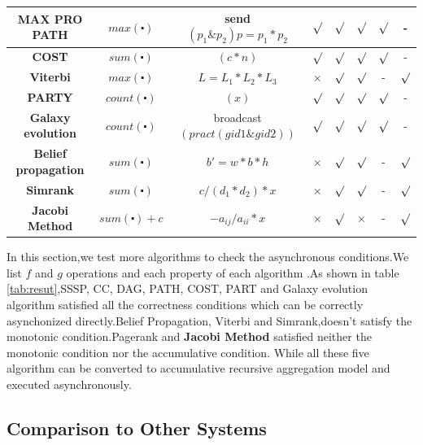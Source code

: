 \begin{table}[!t]
\begin{tabular}{c|c|c|c|c|c|c|c}
		\textbf{MAX PRO PATH} & $max(\centerdot)$ &  send$(p_1\& p_2) p=p_1*p_2$ & $\surd$ & $\surd$ & $\surd$ & $\surd$ & -\\
		\hline
		\textbf{COST} & $sum(\centerdot)$&$(c*n)$ & $\surd$ & $\surd$ & $\surd$ & $\surd$ & -\\
		\hline
		\textbf{Viterbi} & $max(\centerdot)$ & $L=L_1*L_2*L_3$ & $\times$ & $\surd$ &  $\surd$ &  - &$\surd$\\
		\hline
		\textbf{PARTY} & $count(\centerdot)$&$(x)$ & $\surd$ & $\surd$ & $\surd$ & $\surd$ & -\\
		\hline
		\textbf{Galaxy evolution} & $count(\centerdot)$ &broadcast$(pract(gid1\& gid2))$ & $\surd$ & $\surd$ & $\surd$ & $\surd$ & -\\
		\hline
		\textbf{Belief propagation} & $sum(\centerdot)$ &$b'=w*b*h$ & $\times$ & $\surd$ & $\surd$ & - & $\surd$\\
		\hline
		\textbf{Simrank} & $sum(\centerdot)$& $c/(d_1*d_2)*x$ & $\times$ &  $\surd$ &  $\surd$ & - & $\surd$\\
		\hline
		\textbf{Jacobi Method} &$sum(\centerdot)+c$ &$-a_{ij}/a_{ii}*x$& $\times$ & $\surd$  & $\times$ & - & $\surd$\\
		\hline
		\hline
	\end{tabular}
	\vspace{-0.1in}
\end{table}

In this section,we test more algorithms to check the asynchronous conditions.We list $f$ and $g$ operations and each property of each algorithm .As shown in table \ref{tab:resut},SSSP, CC, DAG, PATH, COST, PART and Galaxy evolution algorithm satisfied all the correctness conditions which can be correctly asynchonized directly.Belief Propagation, Viterbi and Simrank,doesn't satisfy the monotonic condition.Pagerank and \textbf{Jacobi Method} satisfied neither the monotonic condition nor the accumulative condition. While all these five algorithm can be converted to accumulative recursive aggregation model and executed asynchronously. 

\subsection{Comparison to Other Systems}
\label{sec:expr:othersystems}

